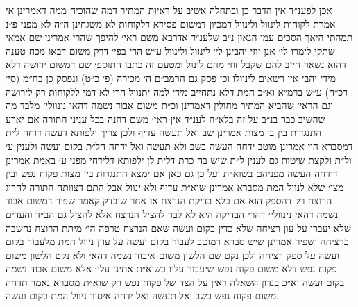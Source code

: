 \documentclass[12pt, openany]{book}
\begin{document}
\begin{multicols}{2}
אכן לפענ״ד אין הדבר כן ובתחלה אשיב על ראיות המתיר דמה שהוכיח ממה דאמרינן אי אמרת לקוחות לינוול ולינוול דמכיון דמשום פסידא דלקוחות לא משגחינן ה״ה לא מפני פ״נ תמהתי היאך הסכים עמו הגאון נ״ב שלענ״ד אדרבא משם ראי׳ להיפך שהרי אמרינן שם אמאי שתקי לימרו לי׳ אנן זוזי יהבינן לי׳ לינוול ולינוול ע״ש הרי בפי׳ דרק משום דבאו מכח טענה דהוא נשאר חייב להם שקבל זוזי מהם לינול ומטעם זה כתבו התוספ׳ שם דמשום ירושה דלא מידי יהבי אין רשאים לינוולו וכן פסק גם הרמב״ם ה׳ מכירה (פ׳ כ״ט) ונפסק כן בח״מ (סי׳ רכ״ה) ע״ש ברמ״א וא״כ המת דלא נתחייב מידי למה יתנוול הרי לא דמי ללקוחות רק לירושה וגם הראי׳ שהביא המתיר מחולין דאמרינן וכ״ת משום אבוד נשמה דהאי נינוולי׳ מלבד מה שהשיב כבר בנ״ב על זה בלא״ה לענ״ד אין ראי׳ משם דהנה בכל עניני התורה אם יארע התנגדות בין ב׳ מצות אמרינן שב ואל תעשה עדיף ולכן צריך ילפותא דעשה דוחה ל״ת דמסברא הוי אמרינן מוטב ידחה העשה בשב ולא תעשה ואל ידחה הל״ת בקום ועשה ולענין ע׳ ול״ת ולקצת שיטות גם לענין ל״ת שיש בה כרת דלית לן ילפותא דלידחי מפני ע׳ באמת אמרינן דידחה העשה מפניהם בשוא״ת ועל כן גם כאן אם ימצא התנגדות בין מצות פקוח נפש ובין מצו׳ שלא לנוול המת מסברא אמרינן שוא״ת עדיף ולא ינוול אבל התם דצוותה התורה להרוג הרוצח רק דהספק הוא אם בלא בדיקת הנרצח או אחר שיבדק קאמר שפיר דמשום אבוד נשמה דהאי נינוולי׳ דהרי הבדיקה היא לא לבד להציל הנרצח אלא להציל גם הב״ד והעדים שלא יעברו על עון רציחה שלא כדין בקום ועשה שאם הנרצח טרפה הי׳ מיתת הרוצח נחשבה כרציחה ושפיר אמרינן שיש סברא דמוטב לעבור בקום ועשה על עוון ניוול המת מלעבור בקום ועשה על ספק רציחה ולכן נקט שם הלשון משום איבוד נשמה דהאי ולא נקט הלשון משום פקוח נפש דלא משום פקוח נפש שיעבור עליו בשוא״ת אתינן עלי׳ אלא משום אבוד נשמה בקום ועשה וא״כ בנדון השאלה דאין על הצד של פקוח נפש רק שוא״ת מסברא נאמר תדחה משום פקוח נפש בשב ואל תעשה ואל ידחה איסור ניוול המת בקום ועשה.\\\vspace{0pt}


\end{multicols}
\end{document}

